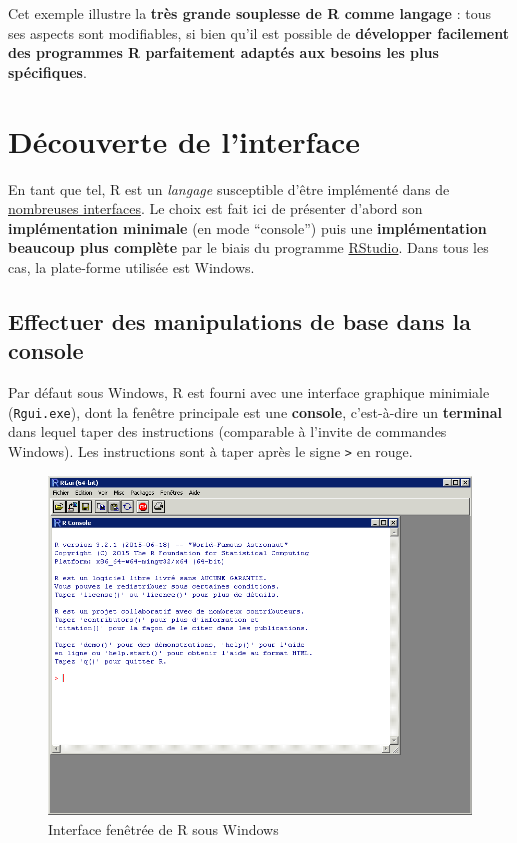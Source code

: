 \documentclass[12pt,twosided, notitlepage]{book}
\begin{document}
Cet exemple illustre la \textbf{très grande souplesse de R comme
langage} : tous ses aspects sont modifiables, si bien qu'il est possible
de \textbf{développer facilement des programmes R parfaitement adaptés
aux besoins les plus spécifiques}.

\section{Découverte de l'interface}\label{decouverte-de-linterface}

En tant que tel, R est un \emph{langage} susceptible d'être implémenté
dans de
\href{https://fr.wikipedia.org/wiki/R_(langage)\#Interfaces}{nombreuses
interfaces}. Le choix est fait ici de présenter d'abord son
\textbf{implémentation minimale} (en mode \enquote{console}) puis une
\textbf{implémentation beaucoup plus complète} par le biais du programme
\href{https://www.rstudio.com/}{RStudio}. Dans tous les cas, la
plate-forme utilisée est Windows.

\subsection{Effectuer des manipulations de base dans la
console}\label{effectuer-des-manipulations-de-base-dans-la-console}

Par défaut sous Windows, R est fourni avec une interface graphique
minimiale (\texttt{Rgui.exe}), dont la fenêtre principale est une
\textbf{console}, c'est-à-dire un \textbf{terminal} dans lequel taper
des instructions (comparable à l'invite de commandes Windows). Les
instructions sont à taper après le signe \texttt{\textgreater{}} en
rouge.

\begin{figure}[htbp]
\centering
\includegraphics{../figures/Interface_R.png}
\caption{Interface fenêtrée de R sous Windows}
\end{figure}
\end{document}
